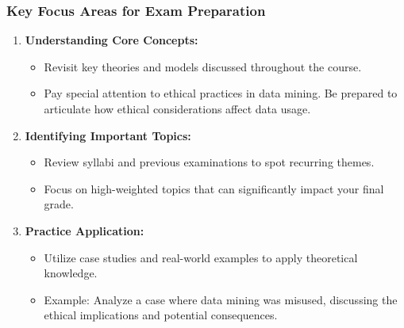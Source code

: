 \documentclass[aspectratio=169]{beamer}
\begin{document}
\begin{frame}[fragile]
    \frametitle{Key Focus Areas for Exam Preparation}
    \begin{enumerate}
        \item \textbf{Understanding Core Concepts:}
        \begin{itemize}
            \item Revisit key theories and models discussed throughout the course.
            \item Pay special attention to ethical practices in data mining. Be prepared to articulate how ethical considerations affect data usage.
        \end{itemize}
        
        \item \textbf{Identifying Important Topics:}
        \begin{itemize}
            \item Review syllabi and previous examinations to spot recurring themes.
            \item Focus on high-weighted topics that can significantly impact your final grade.
        \end{itemize}
        
        \item \textbf{Practice Application:}
        \begin{itemize}
            \item Utilize case studies and real-world examples to apply theoretical knowledge.
            \item Example: Analyze a case where data mining was misused, discussing the ethical implications and potential consequences.
        \end{itemize}
    \end{enumerate}
\end{frame}
\end{document}
